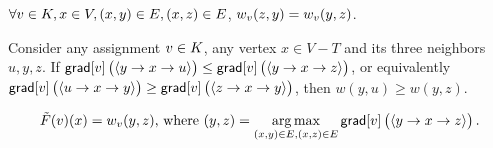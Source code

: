 \documentclass[12pt]{amsart}
\DeclareMathOperator*{\argmax}{arg\,max}
\newcommand{\grad}{\ensuremath{\mathsf{grad}}}
\renewcommand{\path}[1]{\ensuremath{\langle {#1} \rangle}}
\begin{document}
\begin{remark}
$\forall v\in K, x\in V, (x,y)\in E, (x,z)\in E$, $w_{v}(z,y) = w_{v}(y,z)$.
\end{remark}

\begin{remark}\label{rem:gradtowtdavg}
Consider any assignment $v\in K$, any vertex $x\in V-T$ and its three neighbors $u,y,z$. If $\grad[\V{v}]\paren{\path{y \to x \to u}} \leq \grad[\V{v}]\paren{\path{y \to x \to z}}$, or equivalently $\grad[\V{v}]\paren{\path{u \to x\to y}} \geq \grad[\V{v}]\paren{\path{z \to x \to y}}$, then $w(y,u) \geq w(y,z)$.
\end{remark}

\begin{definition}$$\tilde{F}(\V{v})(x) = w_{\V{v}}(y,z) \text{, where }(y,z)=\argmax_{(x,y)\in E, (x,z)\in E}\grad[\V{v}]\paren{\path{y\to x\to z}}.$$
\end{definition}
\end{document}
